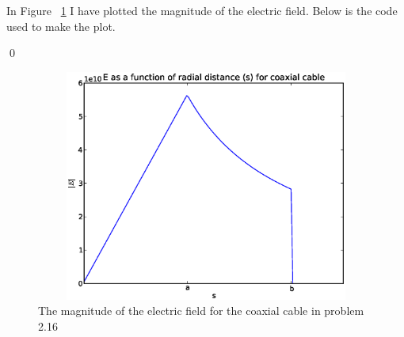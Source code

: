 \documentclass{homework}
\begin{document}
\begin{homeworkProblem}[Problem 2.16]
{  In Figure ~\ref{fig:216} I have plotted the magnitude of the electric field. Below is the code used to make the plot.

  

  \qed
  }


  \begin{figure}[!h]
    \begin{centering}
    \includegraphics[width=4.5in, height=3in]{E2_16.eps}
    \caption{The magnitude of the electric field for the coaxial cable in problem 2.16}
    \label{fig:216}
    \end{centering}
  \end{figure}
\end{homeworkProblem}
\end{document}
